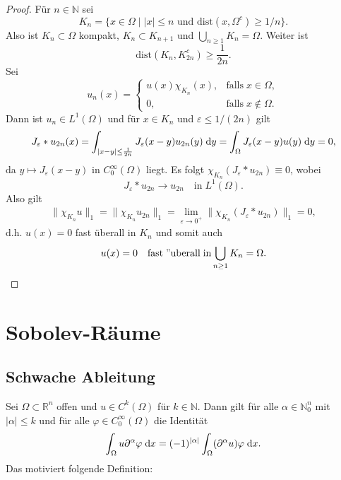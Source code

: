 \documentclass[
paper=a4,
bibtotocnumbered,
liststotocnumbered,
tablecaptionabove,
pointlessnumbers,
twoside,
openright,
10pt
]
{report}
\newcommand{\dist}{\mathrm{dist}}
\let\phi\varphi
\let\epsilon\varepsilon
\theoremstyle{definition}
\numberwithin{equation}{chapter}
\begin{document}
\begin{proof}
Für $n\in\mathbb{N}$ sei
\begin{equation}
K_n=\{x\in\Omega\mid |x|\leq n\text{ und }\dist(x,\Omega^c)\geq 1/n\}.
\end{equation}
Also ist $K_n\subset\Omega$ kompakt, $K_n\subset K_{n+1}$ und $\bigcup_{n\geq 1} K_n=\Omega$. Weiter ist
\begin{equation}
\dist(K_n,K_{2n}^c)\geq \frac{1}{2n}.
\end{equation}
Sei
\begin{equation}
u_n(x)=
\begin{cases}
u(x)\chi_{K_n}(x), &\mathrm{falls}\; x\in\Omega ,\\
0, &\mathrm{falls}\; x\notin\Omega.
\end{cases}
\end{equation}
Dann ist $u_n\in L^1(\Omega)$ und für $x\in K_n$ und $\epsilon\leq 1/(2n)$ gilt
\begin{align}
J_\epsilon\ast u_{2n}(x) 
= \int_{|x-y|\leq\frac{1}{2n}} J_\epsilon(x-y)u_{2n}(y)\d y 
= \int_\Omega J_\epsilon(x-y)u(y)\d y 
=0,
\end{align}
da $y\mapsto J_\epsilon(x-y)$ in $C_0^\infty(\Omega)$ liegt. Es folgt $\chi_{K_n}(J_\epsilon\ast u_{2n})\equiv 0$, wobei
\begin{equation}
J_\epsilon\ast u_{2n} \rightarrow u_{2n}\quad\mathrm{in}\; L^1(\Omega). 
\end{equation}
Also gilt
\begin{align}
\|\chi_{K_n}u\|_1 
= \|\chi_{K_n}u_{2n}\|_1
= \lim\limits_{\epsilon\rightarrow 0^+} \|\chi_{K_n}(J_\epsilon\ast u_{2n})\|_1 =0,
\end{align}
d.h. $u(x)=0$ fast überall in $K_n$ und somit auch
\begin{equation}
u(x)=0\quad\mathrm{fast\;"uberall\; in} \bigcup\limits_{n\geq 1} K_n =\Omega.
\end{equation}
\end{proof}




\chapter{Sobolev-Räume}
\section*{Schwache Ableitung}
Sei $\Omega\subset\mathbb{R}^n$ offen und $u\in C^k(\Omega)$ für $k\in\mathbb{N}$. Dann gilt für alle $\alpha\in\mathbb{N}_0^n$ mit $|\alpha|\leq k$ und für alle $\phi\in C_0^\infty(\Omega)$ die Identität
\begin{equation}
\int_\Omega u\partial^\alpha\phi\d x= (-1)^{|\alpha|}\int_\Omega (\partial^\alpha u)\phi \d x.
\end{equation}
Das motiviert folgende Definition:
\end{document}
